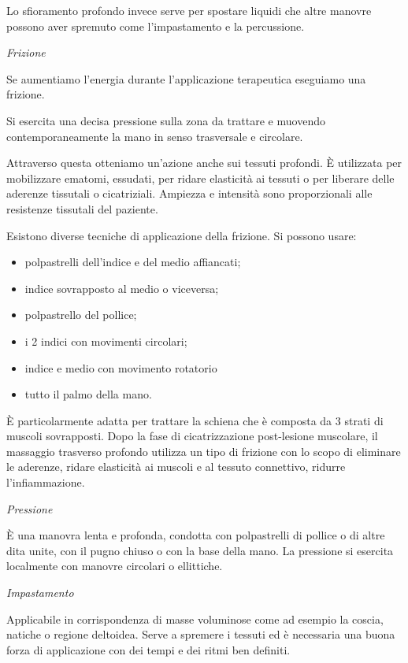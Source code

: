 \documentclass[]{article}
\begin{document}
Lo sfioramento profondo invece serve per spostare liquidi che altre
manovre possono aver spremuto come l'impastamento e la percussione.

\emph{\emph{Frizione}}

Se aumentiamo l'energia durante l'applicazione terapeutica eseguiamo una
frizione.

Si esercita una decisa pressione sulla zona da trattare e muovendo
contemporaneamente la mano in senso trasversale e circolare.

Attraverso questa otteniamo un'azione anche sui tessuti profondi. È
utilizzata per mobilizzare ematomi, essudati, per ridare elasticità ai
tessuti o per liberare delle aderenze tissutali o cicatriziali. Ampiezza
e intensità sono proporzionali alle resistenze tissutali del paziente.

Esistono diverse tecniche di applicazione della frizione. Si possono
usare:

\begin{itemize}
\item
  polpastrelli dell'indice e del medio affiancati;
\item
  indice sovrapposto al medio o viceversa;
\item
  polpastrello del pollice;
\item
  i 2 indici con movimenti circolari;
\item
  indice e medio con movimento rotatorio
\item
  tutto il palmo della mano.
\end{itemize}

È particolarmente adatta per trattare la schiena che è composta da 3
strati di muscoli sovrapposti. Dopo la fase di cicatrizzazione
post-lesione muscolare, il massaggio trasverso profondo utilizza un tipo
di frizione con lo scopo di eliminare le aderenze, ridare elasticità ai
muscoli e al tessuto connettivo, ridurre l'infiammazione.

\emph{\emph{Pressione}}

È una manovra lenta e profonda, condotta con polpastrelli di pollice o
di altre dita unite, con il pugno chiuso o con la base della mano. La
pressione si esercita localmente con manovre circolari o ellittiche.

\emph{\emph{Impastamento}}

Applicabile in corrispondenza di masse voluminose come ad esempio la
coscia, natiche o regione deltoidea. Serve a spremere i tessuti ed è
necessaria una buona forza di applicazione con dei tempi e dei ritmi ben
definiti.
\end{document}
